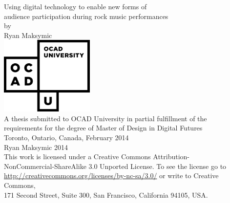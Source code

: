 \begin{titlepage}
\begin{center}

\LARGE{Using digital technology to enable new forms of\\audience participation during rock music performances}\\[0.5cm]
\large{by\\[0.5cm]
Ryan Maksymic}\\[2cm]
\includegraphics[width=0.35\textwidth]{ocadu_logo.png}\\[1.5cm]
\small
A thesis submitted to OCAD University in partial fulfillment of the\\
requirements for the degree of Master of Design in Digital Futures\\[1cm]
Toronto, Ontario, Canada, February 2014\\[1cm]
\ccLogo \hspace{0.05cm} Ryan Maksymic 2014\\[0.5cm]
This work is licensed under a Creative Commons Attribution-\\NonCommercial-ShareAlike 3.0 Unported License. To see the license go to \url{http://creativecommons.org/licenses/by-nc-sa/3.0/} or write to Creative Commons,\\171 Second Street, Suite 300, San Francisco, California 94105, USA.

\end{center}
\end{titlepage}